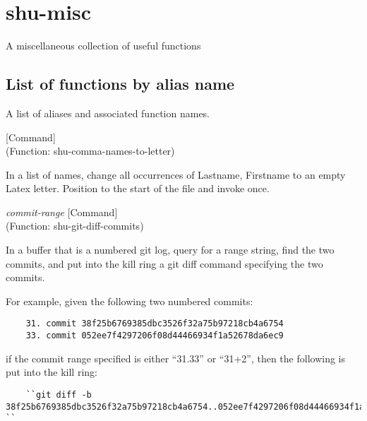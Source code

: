 \section{shu-misc}



A miscellaneous collection of useful functions


\subsection{List of functions by alias name}

A list of aliases and associated function names.



\vspace{1em}
\noindent
{}
\usebox{\funcname}
 \hfill [Command]\\%
 (Function: shu-comma-names-to-letter)

\begin{doc-string}
In a list of names, change all occurrences
of Lastname, Firstname to an empty Latex letter.
Position to the start of the file and invoke once.
\end{doc-string}

\vspace{1em}
\noindent
{}
\usebox{\funcname}\emph{commit-range}
 \hfill [Command]\\%
 (Function: shu-git-diff-commits)

\begin{doc-string}
In a buffer that is a numbered git log, query for a range string, find the two
commits, and put into the kill ring a git diff command specifying the two commits.

For example, given the following two numbered commits:

\begin{verbatim}
    31. commit 38f25b6769385dbc3526f32a75b97218cb4a6754
    33. commit 052ee7f4297206f08d44466934f1a52678da6ec9
\end{verbatim}

if the commit range specified is either ``31.33'' or ``31+2'', then the following
is put into the kill ring:

\begin{verbatim}
    ``git diff -b 38f25b6769385dbc3526f32a75b97218cb4a6754..052ee7f4297206f08d44466934f1a52678da6ec9 ``
\end{verbatim}
\end{doc-string}

